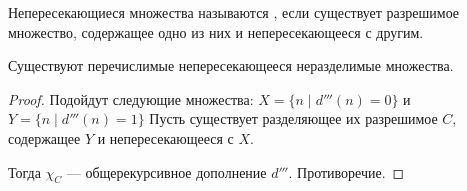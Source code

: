 \begin{defn}
	Непересекающиеся множества называются , если существует разрешимое множество, содержащее одно из них и непересекающееся с другим.
\end{defn}

\begin{cor}\label{cor:separator}
    Существуют перечислимые непересекающееся неразделимые множества. 
\end{cor}
\begin{proof}
	Подойдут следующие множества:
	$ X = \{ n \mid d'''(n) = 0\}$ и  $ Y = \{n \mid d'''(n) =1 \}$
Пусть существует разделяющее их разрешимое $ C$, содержащее $ Y$ и непересекающееся с $ X$.

Тогда $ \chi_C$ --- общерекурсивное дополнение $ d'''$.  Противоречие. 
\end{proof}

